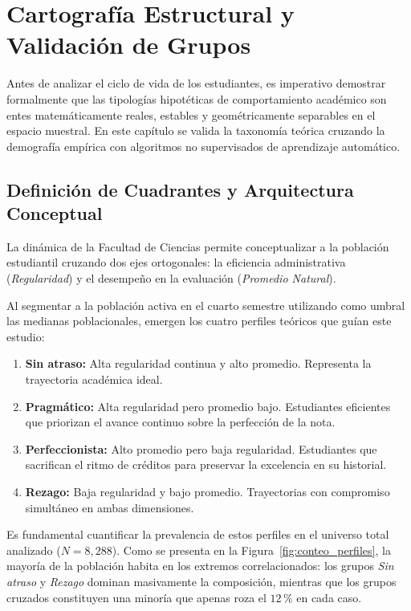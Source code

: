 \chapter{Cartografía Estructural y Validación de Grupos}

Antes de analizar el ciclo de vida de los estudiantes, es imperativo demostrar formalmente que las tipologías hipotéticas de comportamiento académico son entes matemáticamente reales, estables y geométricamente separables en el espacio muestral. En este capítulo se valida la taxonomía teórica cruzando la demografía empírica con algoritmos no supervisados de aprendizaje automático.

\section{Definición de Cuadrantes y Arquitectura Conceptual}

La dinámica de la Facultad de Ciencias permite conceptualizar a la población estudiantil cruzando dos ejes ortogonales: la eficiencia administrativa (\textit{Regularidad}) y el desempeño en la evaluación (\textit{Promedio Natural}). 

Al segmentar a la población activa en el cuarto semestre utilizando como umbral las medianas poblacionales, emergen los cuatro perfiles teóricos que guían este estudio:

\begin{enumerate}
    \item \textbf{Sin atraso:} Alta regularidad continua y alto promedio. Representa la trayectoria académica ideal.
    \item \textbf{Pragmático:} Alta regularidad pero promedio bajo. Estudiantes eficientes que priorizan el avance continuo sobre la perfección de la nota.
    \item \textbf{Perfeccionista:} Alto promedio pero baja regularidad. Estudiantes que sacrifican el ritmo de créditos para preservar la excelencia en su historial.
    \item \textbf{Rezago:} Baja regularidad y bajo promedio. Trayectorias con compromiso simultáneo en ambas dimensiones.
\end{enumerate}

Es fundamental cuantificar la prevalencia de estos perfiles en el universo total analizado ($N = 8{,}288$). Como se presenta en la Figura~\ref{fig:conteo_perfiles}, la mayoría de la población habita en los extremos correlacionados: los grupos \emph{Sin atraso} y \emph{Rezago} dominan masivamente la composición, mientras que los grupos cruzados constituyen una minoría que apenas roza el $12\,\%$ en cada caso.

